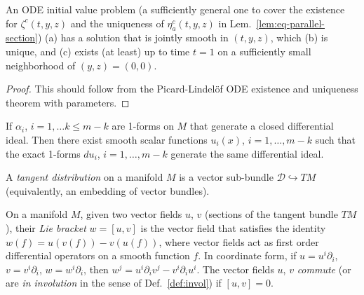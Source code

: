 \begin{lemma} \label{lem:eq-radial-exists}
An ODE initial value problem (a sufficiently general one to cover the existence
for $\zeta^c(t,y,z)$ and the uniqueness of $\eta_{a}^c(t,y,z)$ in
Lem.~\ref{lem:eq-parallel-section}) (a) has a solution that is jointly smooth in
$(t,y,z)$, which (b) is unique, and (c) exists (at least) up to time $t=1$ on a
sufficiently small neighborhood of $(y,z) = (0,0)$.
\end{lemma}
\begin{proof}
This should follow from the Picard-Lindel\"of ODE existence and uniqueness
theorem with parameters.
\end{proof}

\begin{definition} \label{def:forms}
\notready
\end{definition}

\begin{definition} \label{def:diff-ideal}
\notready
\end{definition}

\begin{theorem} \label{thm:frob-forms}
If $\alpha_i$, $i=1,\ldots k\le m-k$ are 1-forms on $M$ that generate a closed
differential ideal. Then there exist smooth scalar functions $u_i(x)$,
$i=1,\ldots,m-k$ such that the exact 1-forms $du_i$, $i=1,\ldots,m-k$ generate
the same differential ideal.
\end{theorem}

\begin{definition} \label{def:vec-dist}
A \emph{tangent distribution} on a manifold $M$ is a vector sub-bundle
$\mathcal{D}\hookrightarrow TM$ (equivalently, an embedding of vector bundles).
\end{definition}

\begin{definition} \label{def:lie}
On a manifold $M$, given two vector fields $u$, $v$ (sections of the tangent
bundle $TM$), their \emph{Lie bracket} $w = [u,v]$ is the vector field that
satisfies the identity $w(f) = u(v(f)) - v(u(f))$, where vector fields act as
first order differential operators on a smooth function $f$. In coordinate form,
if $u = u^i\partial_i$, $v = v^i\partial_i$, $w = w^i\partial_i$, then $w^j =
u^i \partial_i v^j - v^i \partial_i u^i$. The vector fields $u$, $v$
\emph{commute} (or are \emph{in involution} in the sense of
Def.~\ref{def:invol}) if $[u,v] = 0$.
\end{definition}

